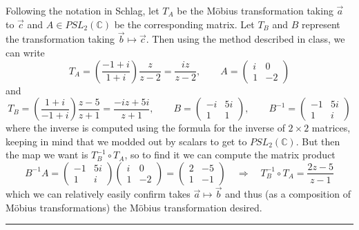 \documentclass[12pt]{article}
\newcommand*{\C}{
\mathbb{C}
}
\newcommand*{\brk}{
\rule{2in}{.1pt}
}
\begin{document}
	Following the notation in Schlag, let $T_A$ be the M\"obius transformation taking $\vec a$ to $\vec c$ and $A\in PSL_2(\C)$ be the corresponding matrix. Let $T_B$ and $B$ represent the transformation taking $\vec b\mapsto\vec c$. Then using the method described in class, we can write
	\[T_A=\left(\frac{-1+i}{1+i}\right)\frac{z}{z-2}=\frac{iz}{z-2},\qquad A=\begin{pmatrix}
		i&0\\1&-2
	\end{pmatrix}\]
	and 
	\[T_B=\left(\frac{1+i}{-1+i}\right)\frac{z-5}{z+1}=\frac{-iz+5i}{z+1},\qquad B=\begin{pmatrix}
		-i & 5i\\ 1&1
	\end{pmatrix},\qquad B^{-1}=\begin{pmatrix}
		-1&5i\\1&i
	\end{pmatrix}\]
	where the inverse is computed using the formula for the inverse of $2\times 2$ matrices, keeping in mind that we modded out by scalars to get to $PSL_2(\C)$. But then the map we want is $T_B^{-1}\circ T_A$, so to find it we can compute the matrix product
	\[B^{-1}A=\begin{pmatrix}
		-1&5i\\1&i
	\end{pmatrix}\begin{pmatrix}
	i&0\\1&-2
	\end{pmatrix}=\begin{pmatrix}
	2&-5\\1&-1
	\end{pmatrix}\quad\Rightarrow\quad T_{B}^{-1}\circ T_A=\frac{2z-5}{z-1}\]
	which we can relatively easily confirm takes $\vec a\mapsto\vec b$ and thus (as a composition of M\"obius transformations) the M\"obius transformation desired.
	
	\brk
	
\end{document}
